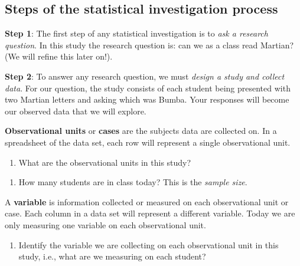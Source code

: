 \documentclass[
]{report}
\providecommand{\tightlist}{%
  \setlength{\itemsep}{0pt}\setlength{\parskip}{0pt}}
\begin{document}
\vspace{0.3in}

\hypertarget{steps-of-the-statistical-investigation-process}{%
\subsection*{Steps of the statistical investigation process}\label{steps-of-the-statistical-investigation-process}}

\textbf{Step 1}: The first step of any statistical investigation is to \emph{ask a research question}. In this study the research question is: can we as a class read Martian? (We will refine this later on!).

\textbf{Step 2}: To answer any research question, we must \emph{design a study and collect data}. For our question, the study consists of each student being presented with two Martian letters and asking which was Bumba. Your responses will become our observed data that we will explore.

\newpage

\textbf{Observational units} or \textbf{cases} are the subjects data are collected on. In a spreadsheet of the data set, each row will represent a single observational unit.

\begin{enumerate}
\def\labelenumi{\arabic{enumi}.}
\tightlist
\item
  What are the observational units in this study?
\end{enumerate}

\vspace{0.4in}

\begin{enumerate}
\def\labelenumi{\arabic{enumi}.}
\setcounter{enumi}{1}
\tightlist
\item
  How many students are in class today? This is the \emph{sample size}.
\end{enumerate}

\vspace{0.3in}

A \textbf{variable} is information collected or measured on each observational unit or case. Each column in a data set will represent a different variable. Today we are only measuring one variable on each observational unit.

\begin{enumerate}
\def\labelenumi{\arabic{enumi}.}
\setcounter{enumi}{2}
\tightlist
\item
  Identify the variable we are collecting on each observational unit in this study, i.e., what are we measuring on each student?
\end{enumerate}
\end{document}

